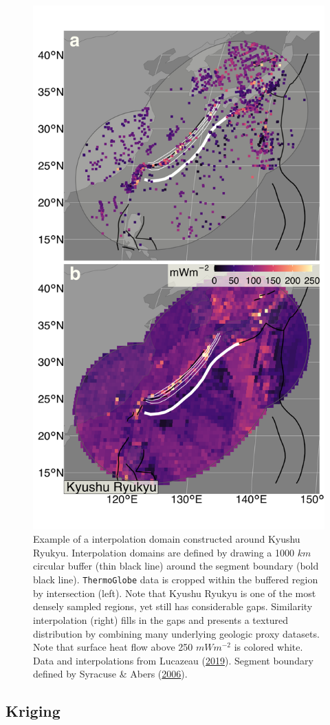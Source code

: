 \begin{figure}[htbp]

{\centering \includegraphics[width=0.6\linewidth,]{assets/figs/chpt3/KyushuRyukyuComp} 

}

\caption[Example of an interpolation domain constructed around Kyushu Ryukyu]{Example of a interpolation domain constructed around Kyushu Ryukyu. Interpolation domains are defined by drawing a 1000 \(km\) circular buffer (thin black line) around the segment boundary (bold black line). \texttt{ThermoGlobe} data is cropped within the buffered region by intersection (left). Note that Kyushu Ryukyu is one of the most densely sampled regions, yet still has considerable gaps. Similarity interpolation (right) fills in the gaps and presents a textured distribution by combining many underlying geologic proxy datasets. Note that surface heat flow above 250 \(mWm^{-2}\) is colored white. Data and interpolations from Lucazeau (\protect\hyperlink{ref-lucazeau2019}{2019}). Segment boundary defined by Syracuse \& Abers (\protect\hyperlink{ref-syracuse2006}{2006}).}\label{fig:domainConstruct}
\end{figure}

\hypertarget{kriging}{%
\subsection{Kriging}\label{kriging}}

